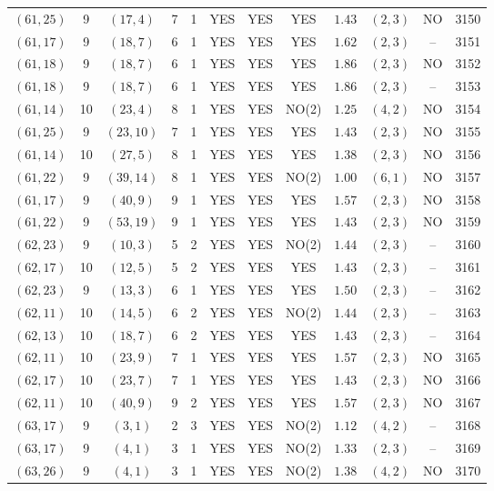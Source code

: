 \begin{longtable}{|c|c|c|c|c|c|c|c|c|c|c|c|}
$(61,25)$ & 9 & $(17,4)$ & 7 & 1 & YES & YES & YES & $1.43$ & $(2,3)$ & NO & 3150\\
$(61,17)$ & 9 & $(18,7)$ & 6 & 1 & YES & YES & YES & $1.62$ & $(2,3)$ & -- & 3151\\
$(61,18)$ & 9 & $(18,7)$ & 6 & 1 & YES & YES & YES & $1.86$ & $(2,3)$ & NO & 3152\\
$(61,18)$ & 9 & $(18,7)$ & 6 & 1 & YES & YES & YES & $1.86$ & $(2,3)$ & -- & 3153\\
$(61,14)$ & 10 & $(23,4)$ & 8 & 1 & YES & YES & NO(2) & $1.25$ & $(4,2)$ & NO & 3154\\
$(61,25)$ & 9 & $(23,10)$ & 7 & 1 & YES & YES & YES & $1.43$ & $(2,3)$ & NO & 3155\\
$(61,14)$ & 10 & $(27,5)$ & 8 & 1 & YES & YES & YES & $1.38$ & $(2,3)$ & NO & 3156\\
$(61,22)$ & 9 & $(39,14)$ & 8 & 1 & YES & YES & NO(2) & $1.00$ & $(6,1)$ & NO & 3157\\
$(61,17)$ & 9 & $(40,9)$ & 9 & 1 & YES & YES & YES & $1.57$ & $(2,3)$ & NO & 3158\\
$(61,22)$ & 9 & $(53,19)$ & 9 & 1 & YES & YES & YES & $1.43$ & $(2,3)$ & NO & 3159\\
$(62,23)$ & 9 & $(10,3)$ & 5 & 2 & YES & YES & NO(2) & $1.44$ & $(2,3)$ & -- & 3160\\
$(62,17)$ & 10 & $(12,5)$ & 5 & 2 & YES & YES & YES & $1.43$ & $(2,3)$ & -- & 3161\\
$(62,23)$ & 9 & $(13,3)$ & 6 & 1 & YES & YES & YES & $1.50$ & $(2,3)$ & -- & 3162\\
$(62,11)$ & 10 & $(14,5)$ & 6 & 2 & YES & YES & NO(2) & $1.44$ & $(2,3)$ & -- & 3163\\
$(62,13)$ & 10 & $(18,7)$ & 6 & 2 & YES & YES & YES & $1.43$ & $(2,3)$ & -- & 3164\\
$(62,11)$ & 10 & $(23,9)$ & 7 & 1 & YES & YES & YES & $1.57$ & $(2,3)$ & NO & 3165\\
$(62,17)$ & 10 & $(23,7)$ & 7 & 1 & YES & YES & YES & $1.43$ & $(2,3)$ & NO & 3166\\
$(62,11)$ & 10 & $(40,9)$ & 9 & 2 & YES & YES & YES & $1.57$ & $(2,3)$ & NO & 3167\\
$(63,17)$ & 9 & $(3,1)$ & 2 & 3 & YES & YES & NO(2) & $1.12$ & $(4,2)$ & -- & 3168\\
$(63,17)$ & 9 & $(4,1)$ & 3 & 1 & YES & YES & NO(2) & $1.33$ & $(2,3)$ & -- & 3169\\
$(63,26)$ & 9 & $(4,1)$ & 3 & 1 & YES & YES & NO(2) & $1.38$ & $(4,2)$ & NO & 3170\\

\end{longtable}
